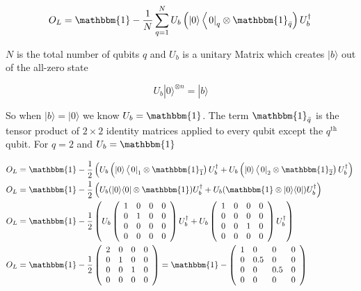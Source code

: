 \documentclass[12pt, oneside]{book}
\begin{document}
$$
O_L=\mathbbm{1}-\frac{1}{N} \sum_{q=1}^N U_b\left(|0\rangle\left\langle\left. 0\right|_q \otimes \mathbbm{1}_{\bar{q}}\right) U_b^{\dagger}\right.
$$

$N$ is the total number of qubits $q$ and $U_b$ is a unitary Matrix which creates $|b\rangle$ out of the all-zero state

$$
U_b|0\rangle^{\otimes n}=|b\rangle
$$

So when $|b\rangle=|0\rangle$ we know $U_b=\mathbbm{1}$. The term $\mathbbm{1}_{\bar{q}}$ is the tensor product of 
$2 \times 2$ identity matrices applied to every qubit except the $q^{\text{th}}$ qubit. For $q=2$ and $U_b=\mathbbm{1}$

$$
\begin{aligned}
& O_L=\mathbbm{1}-\frac{1}{2}\left(U_{b}\left(|0\rangle\left\langle\left. 0\right|_1 \otimes \mathbbm{1}_{\overline{1}}\right) U_b^{\dagger}+U_b\left(|0\rangle\left\langle\left. 0\right|_2 \otimes \mathbbm{1}_{\overline{2}}\right) U_b^{\dagger}\right)\right.\right. \\
& O_L=\mathbbm{1}-\frac{1}{2}\left(U_b(|0\rangle\langle 0| \otimes \mathbbm{1}) U_b^{\dagger}+U_b(\mathbbm{1} \otimes|0\rangle\langle 0|) U_b^{\dagger}\right) \\
& O_L=\mathbbm{1}-\frac{1}{2}\left(U_b\left(\begin{array}{llll}
1 & 0 & 0 & 0 \\
0 & 1 & 0 & 0 \\
0 & 0 & 0 & 0 \\
0 & 0 & 0 & 0
\end{array}\right) U_b^{\dagger}+U_b\left(\begin{array}{llll}
1 & 0 & 0 & 0 \\
0 & 0 & 0 & 0 \\
0 & 0 & 1 & 0 \\
0 & 0 & 0 & 0
\end{array}\right) U_b^{\dagger}\right) \\
& O_L=\mathbbm{1}-\frac{1}{2}\left(\begin{array}{llll}
2 & 0 & 0 & 0 \\
0 & 1 & 0 & 0 \\
0 & 0 & 1 & 0 \\
0 & 0 & 0 & 0 \\
\end{array}\right)=\mathbbm{1}-\left(\begin{array}{llll}
1 & 0 & 0 & 0 \\
0 & 0.5 & 0 & 0 \\
0 & 0 & 0.5 & 0 \\
0 & 0 & 0 & 0
\end{array}\right)
\end{aligned}
$$
\end{document}

